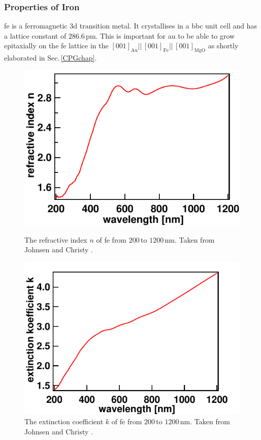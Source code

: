 \documentclass[a4paper,12pt,twoside]{article}
\begin{document}
           \subsubsection{Properties of Iron}
               \label{CPIchap}
\gls{fe} is a ferromagnetic $3\mathrm{d}$ transition metal. It crystallises in a \gls{bbc} unit cell and has a lattice constant of $286.6\,\mathrm{pm}$. This is important for \gls{au} to be able to grow epitaxially on the \gls{fe} lattice in the $[001]_{\mathrm{Au}} ||\, [001]_{\mathrm{Fe}} ||\, [001]_{\mathrm{MgO}}$ as shortly elaborated in Sec.\,\ref{CPGchap}.
	\begin{figure}[H]
		\begin{minipage}[t]{.45\linewidth}
		    \includegraphics[width=\linewidth]{figures/nfe.pdf}
			\caption{The refractive index $n$ of \gls{fe} from $200\,\mathrm{}$to $1200\,\mathrm{nm}$. Taken from Johnsen and Christy \cite{PhysRevB.6.4370}.}
			    \label{nfe}
		\end{minipage}
			\hspace{.075\linewidth}
		\begin{minipage}[t]{.45\linewidth}
			\includegraphics[width=\linewidth]{figures/kfe.pdf}
			\caption{The extinction coefficient $k$ of \gls{fe} from $200\,\mathrm{}$to $1200\,\mathrm{nm}$. Taken from Johnsen and Christy \cite{PhysRevB.6.4370}.}
			    \label{kfe}
		\end{minipage}
	\end{figure}
\end{document}
